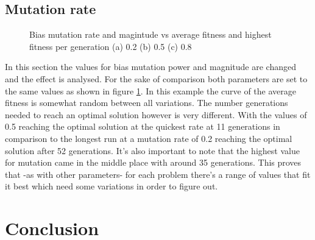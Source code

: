 \documentclass[conference]{IEEEtran}
\begin{document}
\subsection{Mutation rate}
\begin{figure}[h!]
	\centering
	\caption{Bias mutation rate and magintude vs average fitness and highest fitness per generation (a) 0.2  (b) 0.5  (c) 0.8}
	\label{fig:mutations}
\end{figure}
In this section the values for bias mutation power and magnitude are changed and the effect is analysed. For the sake of comparison both parameters are set to the same values as shown in figure \ref{fig:mutations}. In this example the curve of the average fitness is somewhat random between all variations. The number generations needed to reach an optimal solution however is very different. With the values of 0.5 reaching the optimal solution at the quickest rate at 11 generations in comparison to the longest run at a mutation rate of 0.2 reaching the optimal solution after 52 generations. It's also important to note that the highest value for mutation came in the middle place with around 35 generations. This proves that -as with other parameters- for each problem there's a range of values that fit it best which need some variations in order to figure out. 
\section{Conclusion}
 

\end{document}

